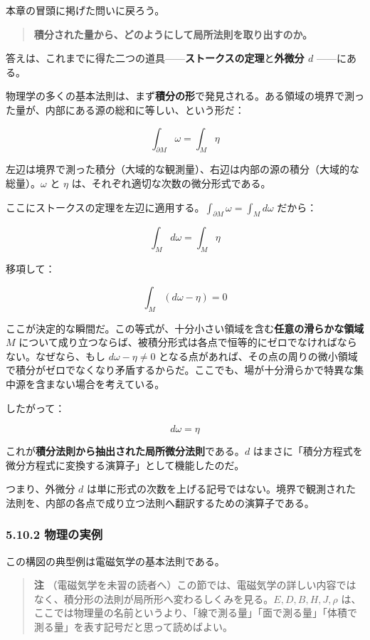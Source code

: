 \documentclass[a4paper,12pt,openany]{book}
\begin{document}
本章の冒頭に掲げた問いに戻ろう。

\begin{quote}
\textbf{積分された量から、どのようにして局所法則を取り出すのか。}
\end{quote}

答えは、これまでに得た二つの道具——\textbf{ストークスの定理}と\textbf{外微分 $d$}
——にある。

物理学の多くの基本法則は、まず\textbf{積分の形}で発見される。ある領域の境界で測った量が、内部にある源の総和に等しい、という形だ：

\[\int_{\partial M} \omega = \int_M \eta\]

左辺は境界で測った積分（大域的な観測量）、右辺は内部の源の積分（大域的な総量）。\(\omega\)
と \(\eta\) は、それぞれ適切な次数の微分形式である。

ここにストークスの定理を左辺に適用する。\(\int_{\partial M} \omega = \int_M d\omega\)
だから：

\[\int_M d\omega = \int_M \eta\]

移項して：

\[\int_M (d\omega - \eta) = 0\]

ここが決定的な瞬間だ。この等式が、十分小さい領域を含む\textbf{任意の滑らかな領域 $M$}
について成り立つならば、被積分形式は各点で恒等的にゼロでなければならない。なぜなら、もし
\(d\omega - \eta \neq 0\)
となる点があれば、その点の周りの微小領域で積分がゼロでなくなり矛盾するからだ。ここでも、場が十分滑らかで特異な集中源を含まない場合を考えている。

したがって：

\[d\omega = \eta\]

これが\textbf{積分法則から抽出された局所微分法則}である。\(d\)
はまさに「積分方程式を微分方程式に変換する演算子」として機能したのだ。

つまり、外微分 \(d\)
は単に形式の次数を上げる記号ではない。境界で観測された法則を、内部の各点で成り立つ法則へ翻訳するための演算子である。

\hypertarget{ux7269ux7406ux306eux5b9fux4f8b}{%
\subsubsection{5.10.2 物理の実例}\label{ux7269ux7406ux306eux5b9fux4f8b}}

この構図の典型例は電磁気学の基本法則である。

\begin{quote}
\textbf{注}
（電磁気学を未習の読者へ）この節では、電磁気学の詳しい内容ではなく、積分形の法則が局所形へ変わるしくみを見る。\(E,D,B,H,J,\rho\)
は、ここでは物理量の名前というより、「線で測る量」「面で測る量」「体積で測る量」を表す記号だと思って読めばよい。
\end{quote}
\end{document}
